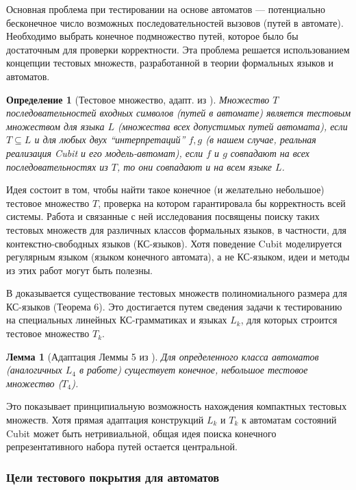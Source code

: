 \documentclass[14pt, russian]{scrartcl}
\newcommand{\enq}[1]{\enquote{#1}}
\newcounter{cDefinition}
\newcounter{cLemma}
\newtheorem{Definition}{Определение}[cDefinition]
\newtheorem{Lemma}{Лемма}[cLemma]
\begin{document}
Основная проблема при тестировании на основе автоматов — потенциально бесконечное число возможных последовательностей вызовов (путей в автомате). Необходимо выбрать конечное подмножество путей, которое было бы достаточным для проверки корректности. Эта проблема решается использованием концепции тестовых множеств, разработанной в теории формальных языков и автоматов.

\begin{Definition}[Тестовое множество, адапт. из \cite{Plandowski1993}]
Множество $T$ последовательностей входных символов (путей в автомате) является \emph{тестовым множеством} для языка $L$ (множества всех допустимых путей автомата), если $T \subseteq L$ и для любых двух \enq{интерпретаций} $f, g$ (в нашем случае, реальная реализация Cubit и его модель-автомат), если $f$ и $g$ совпадают на всех последовательностях из $T$, то они совпадают и на всем языке $L$.
\end{Definition}

Идея состоит в том, чтобы найти такое конечное (и желательно небольшое) тестовое множество $T$, проверка на котором гарантировала бы корректность всей системы. Работа \cite{Plandowski1993} и связанные с ней исследования \cite{Karhumaki1992, Karhumaki1993} посвящены поиску таких тестовых множеств для различных классов формальных языков, в частности, для контекстно-свободных языков (КС-языков). Хотя поведение Cubit моделируется регулярным языком (языком конечного автомата), а не КС-языком, идеи и методы из этих работ могут быть полезны.

В \cite{Plandowski1993} доказывается существование тестовых множеств полиномиального размера для КС-языков (Теорема 6). Это достигается путем сведения задачи к тестированию на специальных линейных КС-грамматиках и языках $L_k$, для которых строится тестовое множество $T_k$.

\begin{Lemma}[Адаптация Леммы 5 из \cite{Plandowski1993}]
Для определенного класса автоматов (аналогичных $L_4$ в работе) существует конечное, небольшое тестовое множество ($T_4$).
\end{Lemma}
Это показывает принципиальную возможность нахождения компактных тестовых множеств. Хотя прямая адаптация конструкций $L_k$ и $T_k$ к автоматам состояний Cubit может быть нетривиальной, общая идея поиска конечного репрезентативного набора путей остается центральной.

\subsubsection{Цели тестового покрытия для автоматов}
\end{document}
